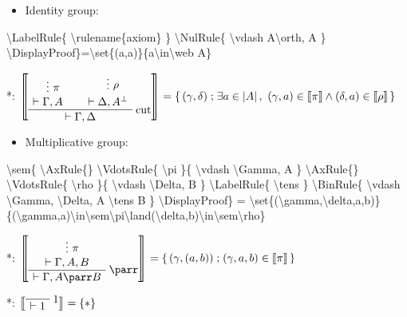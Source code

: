 \begin{itemize}
\tightlist
\item
  Identity group:

\end{itemize}

\textbackslash{}LabelRule\{ \textbackslash{}rulename\{axiom\} \}
\textbackslash{}NulRule\{ \textbackslash{}vdash A\textbackslash{}orth, A
\}
\textbackslash{}DisplayProof\}=\textbackslash{}set\{(a,a)\}\{a\textbackslash{}in\textbackslash{}web
A\}

*: \(\sem{
\AxRule{}
\VdotsRule{ \pi }{ \vdash \Gamma, A }
\AxRule{}
\VdotsRule{ \rho }{ \vdash \Delta, A\orth }
\LabelRule{ \rulename{cut} }
\BinRule{ \vdash \Gamma, \Delta }
\DisplayProof} = \set{(\gamma,\delta)}{\exists a\in\web A,\ (\gamma,a)\in\sem\pi\land(\delta,a)\in\sem\rho}\)

\begin{itemize}
\tightlist
\item
  Multiplicative group:

  \begin{description}
  \tightlist
  \item[]
  \end{description}
\end{itemize}

\textbackslash{}sem\{ \textbackslash{}AxRule\{\}
\textbackslash{}VdotsRule\{ \textbackslash{}pi \}\{
\textbackslash{}vdash \textbackslash{}Gamma, A \}
\textbackslash{}AxRule\{\} \textbackslash{}VdotsRule\{
\textbackslash{}rho \}\{ \textbackslash{}vdash \textbackslash{}Delta, B
\} \textbackslash{}LabelRule\{ \textbackslash{}tens \}
\textbackslash{}BinRule\{ \textbackslash{}vdash \textbackslash{}Gamma,
\textbackslash{}Delta, A \textbackslash{}tens B \}
\textbackslash{}DisplayProof\} =
\textbackslash{}set\{(\textbackslash{}gamma,\textbackslash{}delta,a,b)\}\{(\textbackslash{}gamma,a)\textbackslash{}in\textbackslash{}sem\textbackslash{}pi\textbackslash{}land(\textbackslash{}delta,b)\textbackslash{}in\textbackslash{}sem\textbackslash{}rho\}

*: \(\sem{
\AxRule{ }
\VdotsRule{ \pi }{ \vdash \Gamma, A, B }
\LabelRule{ \parr }
\UnaRule{ \vdash \Gamma, A \parr B }
\DisplayProof} =  \set{(\gamma,(a,b))}{(\gamma,a,b)\in\sem\pi}\)

*: \(\sem{
\LabelRule{ \one }
\NulRule{ \vdash \one }
\DisplayProof} = \{ * \}\)

